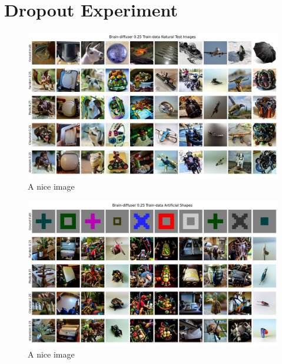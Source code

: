 
\chapter{Dropout Experiment}


\begin{figure}[ht]
   \centering
   \includegraphics[width=1\textwidth]{plots/dropout_qual_eval_bd_test.JPEG}
   \caption{A nice image}\label{fig:dropout_qual_eval_bd_test}
\end{figure}

\begin{figure}[ht]
   \centering
   \includegraphics[width=1\textwidth]{plots/dropout_qual_eval_bd_art.JPEG}
   \caption{A nice image}\label{fig:dropout_qual_eval_bd_art}
\end{figure}


